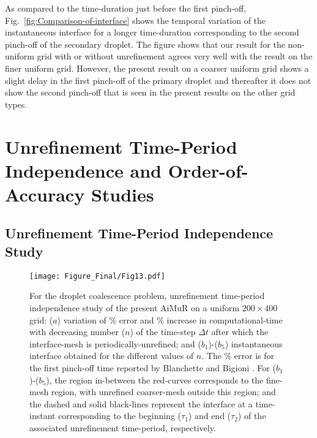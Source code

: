 \documentclass[preprint,12pt]{elsarticle}
\newcommand{\review}[1]{\color{black}#1}
\begin{document}
As compared to the time-duration just before the first pinch-off, Fig.~\ref{fig:Comparison-of-interface} shows the temporal variation of the instantaneous interface for a longer time-duration corresponding to the second pinch-off of the secondary droplet. The figure shows that our result for the non-uniform grid with or without unrefinement agrees very well with the result on the finer uniform grid. However, the present result on a coarser uniform grid shows a slight delay in the first pinch-off of the primary droplet and thereafter it does not show the second pinch-off that is seen in the present results on the other grid types.

\review{

\section{Unrefinement Time-Period Independence and Order-of-Accuracy Studies}

\subsection{Unrefinement Time-Period Independence Study}\label{sub:Unref_freq}

\begin{figure}

\begin{centering}
\texttt{[image: Figure\_Final/Fig13.pdf]}
\par\end{centering}



\protect\caption{\label{fig:adaption_frequency1}
\review{For the droplet coalescence problem, unrefinement time-period independence study of the present AiMuR on a uniform $200 \times 400$ grid: ($a$) variation of \% error and \% increase in computational-time with decreasing number ($n$)  of the time-step $\Delta t$ after which the interface-mesh is periodically-unrefined; and ($b_{1}$)-($b_{5}$) instantaneous interface obtained for the different values of $n$. The \% error is for the first pinch-off time reported by Blanchette and Bigioni \cite{blanchette2006}. For ($b_{1}$)-($b_{5}$), the region in-between the red-curves corresponds to the fine-mesh region, with unrefined coarser-mesh outside this region; and the dashed and solid black-lines represent the interface at a time-instant corresponding to the beginning ($\tau_{1}$) and end ($\tau_{2}$) of the associated unrefinement time-period, respectively.}} 


\end{figure}}
\end{document}
